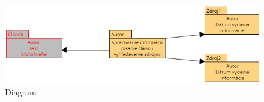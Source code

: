 \documentclass[10pt,twoside,slovak,a4paper]{article}
\begin{document}



\begin{figure}[!ht]
\begin{center}
\includegraphics[width=12cm]{diagram novy.png}
\caption{Diagram}
\end{center}
\end{figure}
\end{document}
